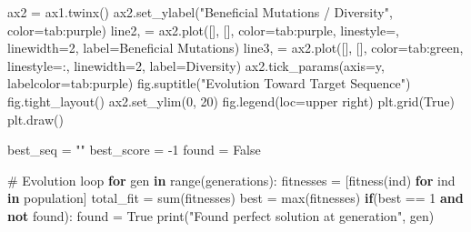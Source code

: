 \documentclass[
  letterpaper,
  DIV=11,
  numbers=noendperiod]{scrreprt}
\newenvironment{Shaded}{\begin{snugshade}}{\end{snugshade}}
\newcommand{\BuiltInTok}[1]{\textcolor[rgb]{0.00,0.23,0.31}{#1}}
\newcommand{\CommentTok}[1]{\textcolor[rgb]{0.37,0.37,0.37}{#1}}
\newcommand{\ControlFlowTok}[1]{\textcolor[rgb]{0.00,0.23,0.31}{\textbf{#1}}}
\newcommand{\DecValTok}[1]{\textcolor[rgb]{0.68,0.00,0.00}{#1}}
\newcommand{\KeywordTok}[1]{\textcolor[rgb]{0.00,0.23,0.31}{\textbf{#1}}}
\newcommand{\NormalTok}[1]{\textcolor[rgb]{0.00,0.23,0.31}{#1}}
\newcommand{\OperatorTok}[1]{\textcolor[rgb]{0.37,0.37,0.37}{#1}}
\newcommand{\StringTok}[1]{\textcolor[rgb]{0.13,0.47,0.30}{#1}}
\newcommand{\VariableTok}[1]{\textcolor[rgb]{0.07,0.07,0.07}{#1}}
\theoremstyle{definition}
\theoremstyle{remark}
\begin{document}
\begin{tcolorbox}
\begin{Shaded}
\begin{Highlighting}[]
\NormalTok{ax2 }\OperatorTok{=}\NormalTok{ ax1.twinx()}
\NormalTok{ax2.set\_ylabel(}\StringTok{"Beneficial Mutations / Diversity"}\NormalTok{, color}\OperatorTok{=}\StringTok{\textquotesingle{}tab:purple\textquotesingle{}}\NormalTok{)}
\NormalTok{line2, }\OperatorTok{=}\NormalTok{ ax2.plot([], [], color}\OperatorTok{=}\StringTok{\textquotesingle{}tab:purple\textquotesingle{}}\NormalTok{, linestyle}\OperatorTok{=}\StringTok{\textquotesingle{}{-}{-}\textquotesingle{}}\NormalTok{, linewidth}\OperatorTok{=}\DecValTok{2}\NormalTok{, label}\OperatorTok{=}\StringTok{\textquotesingle{}Beneficial Mutations\textquotesingle{}}\NormalTok{)}
\NormalTok{line3, }\OperatorTok{=}\NormalTok{ ax2.plot([], [], color}\OperatorTok{=}\StringTok{\textquotesingle{}tab:green\textquotesingle{}}\NormalTok{, linestyle}\OperatorTok{=}\StringTok{\textquotesingle{}:\textquotesingle{}}\NormalTok{, linewidth}\OperatorTok{=}\DecValTok{2}\NormalTok{, label}\OperatorTok{=}\StringTok{\textquotesingle{}Diversity\textquotesingle{}}\NormalTok{)}
\NormalTok{ax2.tick\_params(axis}\OperatorTok{=}\StringTok{\textquotesingle{}y\textquotesingle{}}\NormalTok{, labelcolor}\OperatorTok{=}\StringTok{\textquotesingle{}tab:purple\textquotesingle{}}\NormalTok{)}
\NormalTok{fig.suptitle(}\StringTok{"Evolution Toward Target Sequence"}\NormalTok{)}
\NormalTok{fig.tight\_layout()}
\NormalTok{ax2.set\_ylim(}\DecValTok{0}\NormalTok{, }\DecValTok{20}\NormalTok{)}
\NormalTok{fig.legend(loc}\OperatorTok{=}\StringTok{\textquotesingle{}upper right\textquotesingle{}}\NormalTok{)}
\NormalTok{plt.grid(}\VariableTok{True}\NormalTok{)}
\NormalTok{plt.draw()}

\NormalTok{best\_seq }\OperatorTok{=} \StringTok{""}
\NormalTok{best\_score }\OperatorTok{=} \OperatorTok{{-}}\DecValTok{1}
\NormalTok{found }\OperatorTok{=} \VariableTok{False}

\CommentTok{\# Evolution loop}
\ControlFlowTok{for}\NormalTok{ gen }\KeywordTok{in} \BuiltInTok{range}\NormalTok{(generations):}
\NormalTok{    fitnesses }\OperatorTok{=}\NormalTok{ [fitness(ind) }\ControlFlowTok{for}\NormalTok{ ind }\KeywordTok{in}\NormalTok{ population]}
\NormalTok{    total\_fit }\OperatorTok{=} \BuiltInTok{sum}\NormalTok{(fitnesses)}
\NormalTok{    best }\OperatorTok{=} \BuiltInTok{max}\NormalTok{(fitnesses)}
    \ControlFlowTok{if}\NormalTok{(best }\OperatorTok{==} \DecValTok{1} \KeywordTok{and} \KeywordTok{not}\NormalTok{ found):}
\NormalTok{        found }\OperatorTok{=} \VariableTok{True}
        \BuiltInTok{print}\NormalTok{(}\StringTok{"Found perfect solution at generation"}\NormalTok{, gen)}
        

\end{Highlighting}
\end{Shaded}
\end{tcolorbox}
\end{document}
